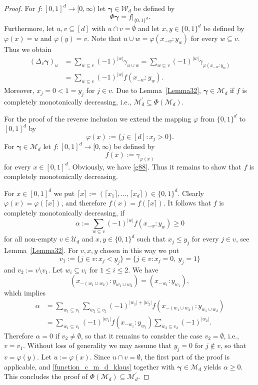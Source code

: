 \documentclass{article}
\newcommand{\bg}{{\boldsymbol{\gamma}}}
\newcommand{\U}  {\mathcal{U}}
\newcommand{\W}  {\mathcal{W}}
\newcommand{\M}  {\mathcal{M}}
\theoremstyle{plain}
\theoremstyle{definition}
\begin{document}
\begin{proof}
For $f \colon [0,1]^d \to {[0,\infty)}$ let $\bg \in \W_d$ be
defined by 
\begin{equation}\label{g88}
\Phi \bg  = f|_{\{0,1\}^d}. 
\end{equation}
Furthermore, let $u,v \subseteq [d]$ with $u \cap v = \emptyset$ and
let $x,y \in \{0,1\}^d$ be defined by
$\varphi(x) = u$ and $\varphi(y) = v$.
Note that $u \cup w = \varphi(x_{-w}\!:\!y_w)$ for every $w \subseteq v$. 
Thus we obtain
\begin{align}\label{function_c_m_d_klaus}
\left(\Delta_v \bg \right)_u 
&= 
\sum_{w\subseteq v} (-1)^{|w|} \gamma_{u\cup w} =
\sum_{w\subseteq v} (-1)^{|w|} \gamma_{\varphi(x_{-w}:y_w)}
\nonumber\\
&=
\sum_{w\subseteq v} (-1)^{|w|} f(x_{-w}\!:\!y_w).
\end{align}
Moreover, $x_j = 0 <1 = y_j$ for $j \in v$. 
Due to Lemma~\ref{Lemma32}, $\bg \in \M_d$ 
if $f$ is completely monotonically decreasing, i.e., 
$\M_d^\prime \subseteq \Phi(\M_d)$.

For the proof of the reverse inclusion we extend the mapping
$\varphi$ from $\{0,1\}^d$ to $[0,1]^d$ by
\[
\varphi(x) := \{ j \in [d] : x_j > 0\}.
\]
For $\bg \in \M_d$ let $f \colon [0,1]^d \to {[0,\infty)}$
be defined by 
\[
f(x) := \gamma_{\varphi(x)}
\]
for every $x \in [0,1]^d$. Obviously, we have \eqref{g88}. Thus it
remains to show that $f$ is completely monotonically decreasing.

For $x \in [0,1]^d$ we put 
$\lceil x \rceil := (\lceil x_1 \rceil, \dots, \lceil x_d \rceil) 
\in \{0,1\}^d$. Clearly $\varphi(x) = \varphi(\lceil x \rceil)$,
and therefore $f(x) = f(\lceil x \rceil)$. It follows that $f$ is 
completely monotonically decreasing, if 
\[
\alpha := \sum_{w \subseteq v} (-1)^{|w|} f(x_{-w}\!:\!y_w) \geq 0
\]
for all non-empty $v\in \U_d$ and $x, y\in \{0,1\}^d$ 
such that $x_j \leq y_j$ for every $j \in v$, see Lemma~\ref{Lemma32}.
For $v,x,y$ chosen in this way we put
\[
v_1 := \{j \in v : x_j < y_j\} = \{j \in v : x_j = 0,\ y_j=1\}
\]
and $v_2 := v \setminus v_1$.
Let $w_i \subseteq v_i$ for $1\le i\le 2$. We have
\[
(x_{-(w_1 \cup w_2)}\!:\! y_{w_1 \cup w_2}) = (x_{-w_1}\!:\!y_{w_1}),
\]
which implies
\begin{align*}
\alpha &=
\sum_{w_1 \subseteq v_1} \sum_{w_2 \subseteq v_2}
(-1)^{|w_1|+|w_2|} f(x_{-(w_1\cup w_2)}\!:\!y_{w_1\cup w_2})\\
&=
\sum_{w_1 \subseteq v_1} (-1)^{|w_1|} f(x_{-w_1}\!:\!y_{w_1})
\sum_{w_2 \subseteq v_2} (-1)^{|w_2|}.
\end{align*}
Therefore $\alpha = 0$ if $v_2 \neq \emptyset$, so that
it remains to consider the case $v_2 = \emptyset$, i.e., $v = v_1$.
Without loss of generality we may assume that $y_j = 0$ for
$j \not\in v$, so that $v = \varphi(y)$. Let $u := \varphi(x)$.
Since $u \cap v = \emptyset$, the first part of the proof is
applicable, and \eqref{function_c_m_d_klaus} together with $\bg \in
\M_d$ yields $\alpha \geq 0$. This concludes the proof of
$\Phi(\M_d) \subseteq \M_d^\prime$.
\end{proof}
\end{document}
